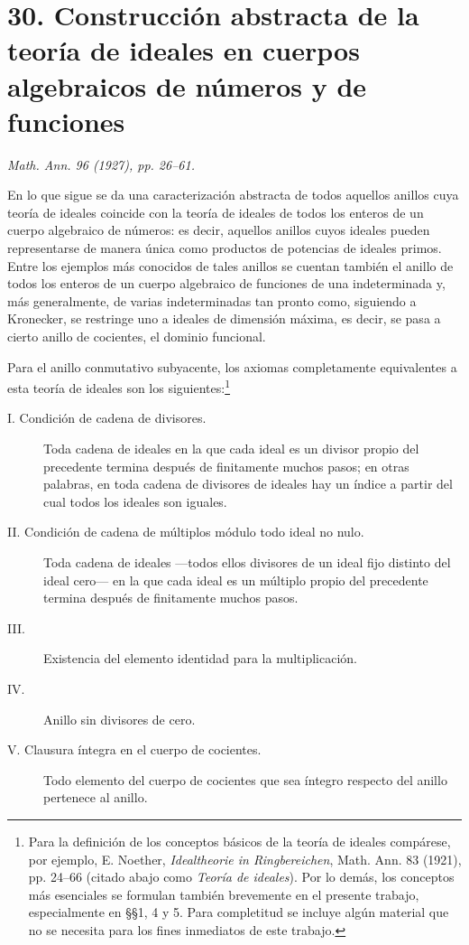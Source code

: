 \documentclass[11pt]{article}
\begin{document}
\section*{30. Construcción abstracta de la teoría de ideales en cuerpos algebraicos de números y de funciones}
\noindent\emph{Math. Ann. 96 (1927), pp. 26--61.}

En lo que sigue se da una caracterización abstracta de todos aquellos anillos cuya teoría de ideales coincide con la teoría de ideales de todos los enteros de un cuerpo algebraico de números: es decir, aquellos anillos cuyos ideales pueden representarse de manera única como productos de potencias de ideales primos. Entre los ejemplos más conocidos de tales anillos se cuentan también el anillo de todos los enteros de un cuerpo algebraico de funciones de una indeterminada y, más generalmente, de varias indeterminadas tan pronto como, siguiendo a Kronecker, se restringe uno a ideales de dimensión máxima, es decir, se pasa a cierto anillo de cocientes, el dominio funcional.

Para el anillo conmutativo subyacente, los axiomas completamente equivalentes a esta teoría de ideales son los siguientes:\footnote{Para la definición de los conceptos básicos de la teoría de ideales compárese, por ejemplo, E. Noether, \emph{Idealtheorie in Ringbereichen}, Math. Ann. 83 (1921), pp. 24--66 (citado abajo como \emph{Teoría de ideales}). Por lo demás, los conceptos más esenciales se formulan también brevemente en el presente trabajo, especialmente en §§1, 4 y 5. Para completitud se incluye algún material que no se necesita para los fines inmediatos de este trabajo.}

\begin{description}
\item[I. Condición de cadena de divisores.] Toda cadena de ideales en la que cada ideal es un divisor propio del precedente termina después de finitamente muchos pasos; en otras palabras, en toda cadena de divisores de ideales hay un índice a partir del cual todos los ideales son iguales.
\item[II. Condición de cadena de múltiplos módulo todo ideal no nulo.] Toda cadena de ideales ---todos ellos divisores de un ideal fijo distinto del ideal cero--- en la que cada ideal es un múltiplo propio del precedente termina después de finitamente muchos pasos.
\item[III.] Existencia del elemento identidad para la multiplicación.
\item[IV.] Anillo sin divisores de cero.
\item[V. Clausura íntegra en el cuerpo de cocientes.] Todo elemento del cuerpo de cocientes que sea íntegro respecto del anillo pertenece al anillo.
\end{description}
\end{document}
